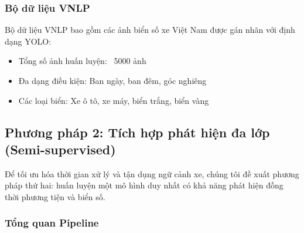 \subsubsection{Bộ dữ liệu VNLP}
Bộ dữ liệu VNLP bao gồm các ảnh biển số xe Việt Nam được gán nhãn với định dạng YOLO:
\begin{itemize}
    \item Tổng số ảnh huấn luyện: ~5000 ảnh
    \item Đa dạng điều kiện: Ban ngày, ban đêm, góc nghiêng
    \item Các loại biển: Xe ô tô, xe máy, biển trắng, biển vàng
\end{itemize}

\subsection{Phương pháp 2: Tích hợp phát hiện đa lớp (Semi-supervised)}

Để tối ưu hóa thời gian xử lý và tận dụng ngữ cảnh xe, chúng tôi đề xuất phương pháp thứ hai: huấn luyện một mô hình duy nhất có khả năng phát hiện đồng thời phương tiện và biển số.

\subsubsection{Tổng quan Pipeline}

